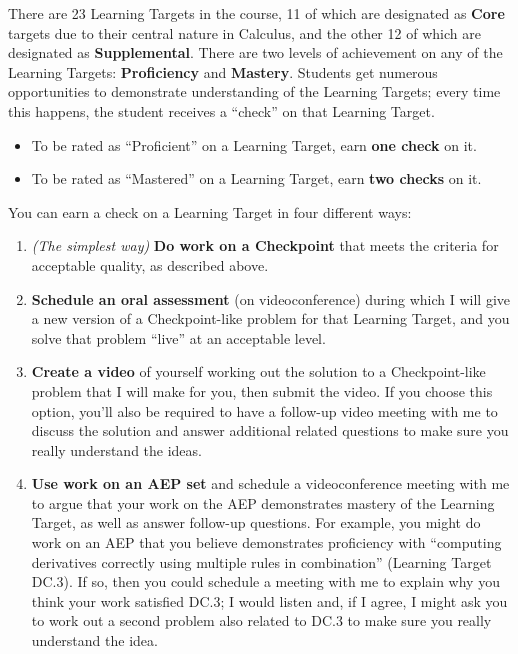 \documentclass[]{article}
\providecommand{\tightlist}{%
  \setlength{\itemsep}{0pt}\setlength{\parskip}{0pt}}
\begin{document}
There are 23 Learning Targets in the course, 11 of which are designated
as \textbf{Core} targets due to their central nature in Calculus, and
the other 12 of which are designated as \textbf{Supplemental}. There are
two levels of achievement on any of the Learning Targets:
\textbf{Proficiency} and \textbf{Mastery}. Students get numerous
opportunities to demonstrate understanding of the Learning Targets;
every time this happens, the student receives a ``check'' on that
Learning Target.

\begin{itemize}
\tightlist
\item
  To be rated as ``Proficient'' on a Learning Target, earn \textbf{one
  check} on it.
\item
  To be rated as ``Mastered'' on a Learning Target, earn \textbf{two
  checks} on it.
\end{itemize}

You can earn a check on a Learning Target in four different ways:

\begin{enumerate}
\def\labelenumi{\arabic{enumi}.}
\tightlist
\item
  \emph{(The simplest way)} \textbf{Do work on a Checkpoint} that meets
  the criteria for acceptable quality, as described above.
\item
  \textbf{Schedule an oral assessment} (on videoconference) during which
  I will give a new version of a Checkpoint-like problem for that
  Learning Target, and you solve that problem ``live'' at an acceptable
  level.
\item
  \textbf{Create a video} of yourself working out the solution to a
  Checkpoint-like problem that I will make for you, then submit the
  video. If you choose this option, you'll also be required to have a
  follow-up video meeting with me to discuss the solution and answer
  additional related questions to make sure you really understand the
  ideas.
\item
  \textbf{Use work on an AEP set} and schedule a videoconference meeting
  with me to argue that your work on the AEP demonstrates mastery of the
  Learning Target, as well as answer follow-up questions. For example,
  you might do work on an AEP that you believe demonstrates proficiency
  with ``computing derivatives correctly using multiple rules in
  combination'' (Learning Target DC.3). If so, then you could schedule a
  meeting with me to explain why you think your work satisfied DC.3; I
  would listen and, if I agree, I might ask you to work out a second
  problem also related to DC.3 to make sure you really understand the
  idea.
\end{enumerate}
\end{document}
